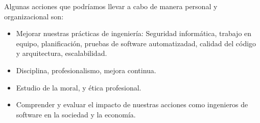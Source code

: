 \documentclass[twoside]{article}
\begin{document}
\begin{multicols}{2}
Algunas acciones que podríamos llevar a cabo de manera personal y organizacional
son:

\begin{itemize}
\item Mejorar nuestras prácticas de ingeniería: Seguridad informática, trabajo
en equipo, planificación, pruebas de software automatizadad, calidad del código
y arquitectura, escalabilidad.
\item Disciplina, profesionalismo, mejora continua.
\item Estudio de la moral, y ética profesional.
\item Comprender y evaluar el impacto de nuestras acciones como ingenieros de
software en la sociedad y la economía.
\end{itemize}

\pagebreak
 


\end{multicols}
\end{document}
